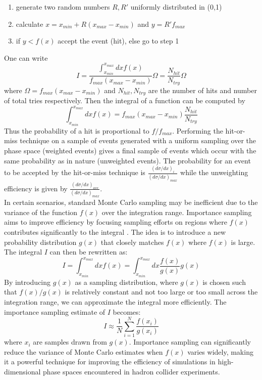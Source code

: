 \begin{enumerate}
    \item generate two random numbers $R, R'$ uniformly distributed in (0,1)
    \item  calculate $x = x_{min} + R(x_{max}-x_{min})$ and $y = R'f_{max}$
    \item if $y< f(x)$ accept the event (hit), else go to step 1
\end{enumerate}
One can write 
\begin{equation}
    I = \frac{\int_{x_{min}}^{x_{max}} dx f(x)}{f_{max}(x_{max} -x_{min})}\Omega = \frac{N_{hit}}{N_{try}}\Omega
\end{equation}
where $\Omega = f_{max} (x_{max} - x_{min})$ and $N_{hit}, N_{try}$ are the number of hits and number of total tries respectively. Then the integral of a function can be computed by
\begin{equation}
    \int_{x_{min}}^{x_{max}}dxf(x) = f_{max}(x_{max}-x_{min})\frac{N_{hit}}{N_{try}}
\end{equation}
Thus the probability of a hit is proportional to $f/f_{max}$. Performing the hit-or-miss technique on a sample of events generated with a uniform sampling over the phase space (weighted events) gives a final sample of events which occur with the same probability as in nature (unweighted events). The probability for an event to be accepted by the hit-or-miss technique is $\frac{(d\sigma/dx)_i}{(d\sigma/dx)_{max}}$ while the unweighting efficiency is given by $\frac{(d\sigma/dx)_{ave}}{(d\sigma/dx)_{max}}$.\\
\indent In certain scenarios, standard Monte Carlo sampling may be inefficient due to the variance of the function \( f(x) \) over the integration range. Importance sampling aims to improve efficiency by focusing sampling efforts on regions where \( f(x) \) contributes significantly to the integral \cite{elvira2022advances}. The idea is to introduce a new probability distribution \( g(x) \) that closely matches \( f(x) \) where \( f(x) \) is large. The integral \( I \) can then be rewritten as:
\begin{equation}
    I = \int_{x_{min}}^{x_{max}} dx f(x) = \int_{x_{min}}^{x_{max}} dx \frac{f(x)}{g(x)} g(x)
\end{equation}
By introducing \( g(x) \) as a sampling distribution, where \( g(x) \) is chosen such that \( f(x)/g(x) \) is relatively constant and not too large or too small across the integration range, we can approximate the integral more efficiently. The importance sampling estimate of \( I \) becomes:
\begin{equation}
     I \approx \frac{1}{N} \sum_{i=1}^N \frac{f(x_i)}{g(x_i)}
\end{equation}
where \( x_i \) are samples drawn from \( g(x) \). Importance sampling can significantly reduce the variance of Monte Carlo estimates when \( f(x) \) varies widely, making it a powerful technique for improving the efficiency of simulations in high-dimensional phase spaces encountered in hadron collider experiments.

